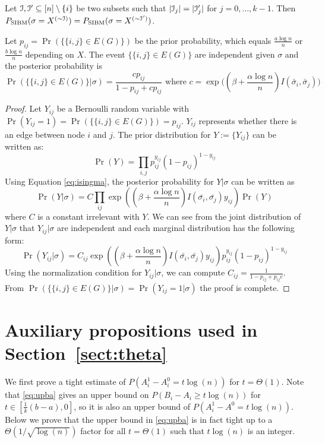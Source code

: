 \documentclass{article}
\begin{document}
\begin{lemma} \label{lm:cc}
Let $\mathcal{I},\mathcal{I}'\subseteq[n]\setminus\{i\}$ be two subsets such that $|\mathcal{I}_j|=|\mathcal{I}_j'|$ for $j=0,\dots,k-1$. 
Then $P_{\operatorname{SIBM}}(\sigma=X^{(\sim\mathcal{I})}) = P_{\operatorname{SIBM}}(\sigma=X^{(\sim\mathcal{I}')})$.
\end{lemma}

\begin{lemma}\label{lem:post_independent}
Let $p_{ij}=\Pr(\{\{i,j\} \in E(G) \})$ be the prior probability, which equals $\frac{a\log n}{n}$ or $\frac{b\log n}{n}$ depending on $X$.
The event $\{\{i,j\} \in E(G) \}$ are independent given $\sigma$ and the posterior probability is
\begin{equation}
\Pr(\{\{i,j\} \in E(G) \} | \sigma) = \frac{c p_{ij} }{1-p_{ij} + cp_{ij}} \text{ where  } c= \exp\Big((\beta + \frac{\alpha \log n}{n} ) I(\bar{\sigma}_i, \bar{\sigma}_j) \Big)
\end{equation}
\end{lemma}
\begin{proof}
Let $Y_{ij}$ be a Bernoulli random variable with $\Pr(Y_{ij} = 1) = \Pr(\{\{i,j\} \in E(G)\}) = p_{ij}$. $Y_{ij}$ represents whether there is an edge between node $i$ and $j$.
The prior distribution for $Y:=\{Y_{ij}\}$ can be written as:
$$
\Pr(Y) = \prod_{i,j} p_{ij}^{y_{ij}} (1-p_{ij})^{1-y_{ij}}
$$ 
Using Equation \eqref{eq:isingma}, the posterior probability for $Y| \sigma$ can be written as
$$
\Pr(Y|\sigma) = C\prod_{ij} \exp((\beta + \frac{\alpha \log n}{n})I(\bar{\sigma_i}, \bar{\sigma_j} )y_{ij}) \Pr(Y)
$$
where $C$ is a constant irrelevant with $Y$.
We can see from the joint distribution of $Y|\sigma$ that $Y_{ij} | \sigma$ are independent and each marginal distribution has the following form:
$$
\Pr(Y_{ij} | \sigma) = C_{ij} \exp((\beta + \frac{\alpha \log n}{n})I(\bar{\sigma_i}, \bar{\sigma_j} )y_{ij}) p_{ij}^{y_{ij}} (1-p_{ij})^{1-y_{ij}}
$$
Using the normalization condition for $Y_{ij} | \sigma $, we can compute $C_{ij} = \frac{1}{1-p_{ij} + p_{ij}c}$. From $\Pr(\{\{i,j\} \in E(G) \} | \sigma) =\Pr(Y_{ij}=1|\sigma)$ the proof is complete.
\end{proof}
\section{Auxiliary propositions used in Section~\ref{sect:theta}}\label{ap:um}

We first prove a tight estimate of $P(A^1_i-A^0_i = t\log(n))$ for $t=\Theta(1)$. Note that \eqref{eq:upba} gives an upper bound on $P(B_i-A_i \ge t\log(n))$ for $t\in [\frac{1}{k}(b-a), 0]$, so it is also an upper bound of $P(A^1_i-A^0 = t\log(n))$. Below we prove that the upper bound in \eqref{eq:upba} is in fact tight up to a $\Theta(1/ \sqrt{\log(n)})$ factor for all $t=\Theta(1)$ such that $t\log(n)$ is an integer.
\end{document}
